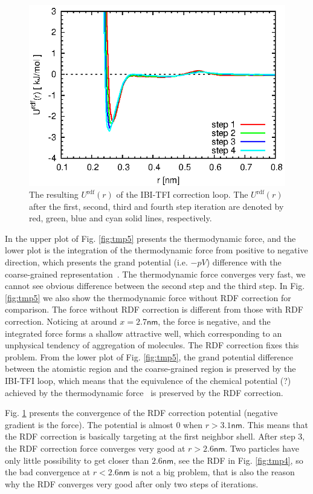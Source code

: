 \documentclass[aps,pre,preprint,unsortedaddress]{revtex4}
\begin{document}
\begin{figure}
  \centering
  \includegraphics{fig/force-rdf.eps}
  \caption{The resulting $U^{\textrm{rdf}}(r)$ of the IBI-TFI
    correction loop.  The $U^{\textrm{rdf}}(r)$ after the first,
    second, third and fourth step iteration are denoted by red, green,
    blue and cyan solid lines, respectively.  }
  \label{fig:tmp6}
\end{figure}

In the upper plot of Fig. \ref{fig:tmp5} presents the thermodynamic
force, and the lower plot is the integration of
the thermodynamic force from positive to negative direction, which
presents the grand potential (i.e. $-pV$) difference with the
coarse-grained representation~\cite{fritsch2011grand}.
The thermodynamic force converges very
fast, we cannot see obvious difference between the second
step and the third step.  In Fig. \ref{fig:tmp5} we also show the
thermodynamic force without RDF correction for comparison. The force
without RDF correction is different from those with RDF
correction. Noticing at around $x=2.7 \textsf{nm}$, the force is
negative, and the integrated force forms a shallow attractive well,
which corresponding to an unphysical tendency of aggregation of molecules. The RDF
correction fixes this problem. From the lower plot of
Fig. \ref{fig:tmp5}, the grand potential difference between the
atomistic region and the coarse-grained region is preserved by the
IBI-TFI loop, which means that the equivalence of the chemical
potential (?) achieved by the thermodynamic
force~\cite{fritsch2011grand} is preserved by the RDF correction.

Fig. \ref{fig:tmp6} presents the convergence of the RDF correction
potential (negative gradient is the force). The potential is almost 0
when $r > 3.1\textsf{nm}$. This means that the RDF correction is
basically targeting at the first neighbor shell. After step 3, the RDF
correction force converges very good at $r > 2.6\textsf{nm}$. Two
particles have only little possibility to get closer than $2.6\textsf{nm}$,
see the RDF in Fig. \ref{fig:tmp4}, so the bad convergence at $r <
2.6\textsf{nm}$ is not a big problem, that is also the reason why the
RDF converges very good after only two steps of iterations.
\end{document}
